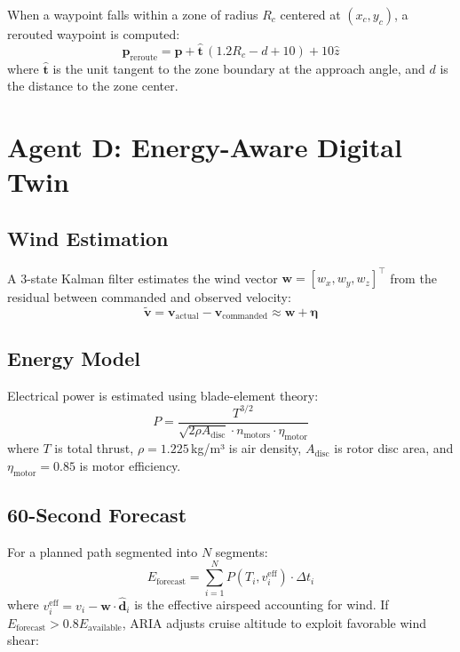 \documentclass[10pt,twocolumn]{article}
\begin{document}
When a waypoint falls within a zone of radius $R_c$ centered at
$(x_c, y_c)$, a rerouted waypoint is computed:
\begin{equation}
    \mathbf{p}_\text{reroute} = \mathbf{p} + \hat{\mathbf{t}}\,(1.2R_c - d + 10) + 10\hat{z}
\end{equation}
where $\hat{\mathbf{t}}$ is the unit tangent to the zone boundary
at the approach angle, and $d$ is the distance to the zone center.

\section{Agent D: Energy-Aware Digital Twin}
\label{sec:agent_d}

\subsection{Wind Estimation}
A 3-state Kalman filter estimates the wind vector
$\mathbf{w} = [w_x, w_y, w_z]^\top$ from the residual between
commanded and observed velocity:
\begin{equation}
    \tilde{\mathbf{v}} = \mathbf{v}_\text{actual} - \mathbf{v}_\text{commanded}
    \approx \mathbf{w} + \boldsymbol{\eta}
\end{equation}

\subsection{Energy Model}
Electrical power is estimated using blade-element theory:
\begin{equation}
    P = \frac{T^{3/2}}{\sqrt{2\rho A_\text{disc}} \cdot n_\text{motors} \cdot \eta_\text{motor}}
\end{equation}
where $T$ is total thrust, $\rho = 1.225$\,kg/m³ is air density,
$A_\text{disc}$ is rotor disc area, and $\eta_\text{motor} = 0.85$
is motor efficiency.

\subsection{60-Second Forecast}
For a planned path segmented into $N$ segments:
\begin{equation}
    E_\text{forecast} = \sum_{i=1}^{N} P(T_i, v_i^\text{eff}) \cdot \Delta t_i
\end{equation}
where $v_i^\text{eff} = v_i - \mathbf{w} \cdot \hat{\mathbf{d}}_i$ is the
effective airspeed accounting for wind. If $E_\text{forecast} > 0.8 E_\text{available}$,
ARIA adjusts cruise altitude to exploit favorable wind shear:
\end{document}
